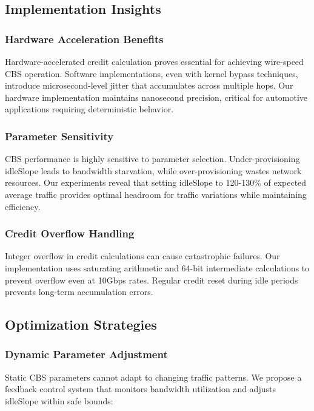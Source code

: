 \documentclass[10pt, journal, compsoc]{IEEEtran}
\begin{document}
\subsection{Implementation Insights}

\subsubsection{Hardware Acceleration Benefits}

Hardware-accelerated credit calculation proves essential for achieving wire-speed CBS operation. Software implementations, even with kernel bypass techniques, introduce microsecond-level jitter that accumulates across multiple hops. Our hardware implementation maintains nanosecond precision, critical for automotive applications requiring deterministic behavior.

\subsubsection{Parameter Sensitivity}

CBS performance is highly sensitive to parameter selection. Under-provisioning idleSlope leads to bandwidth starvation, while over-provisioning wastes network resources. Our experiments reveal that setting idleSlope to 120-130\% of expected average traffic provides optimal headroom for traffic variations while maintaining efficiency.

\subsubsection{Credit Overflow Handling}

Integer overflow in credit calculations can cause catastrophic failures. Our implementation uses saturating arithmetic and 64-bit intermediate calculations to prevent overflow even at 10Gbps rates. Regular credit reset during idle periods prevents long-term accumulation errors.

\subsection{Optimization Strategies}

\subsubsection{Dynamic Parameter Adjustment}

Static CBS parameters cannot adapt to changing traffic patterns. We propose a feedback control system that monitors bandwidth utilization and adjusts idleSlope within safe bounds:
\end{document}
